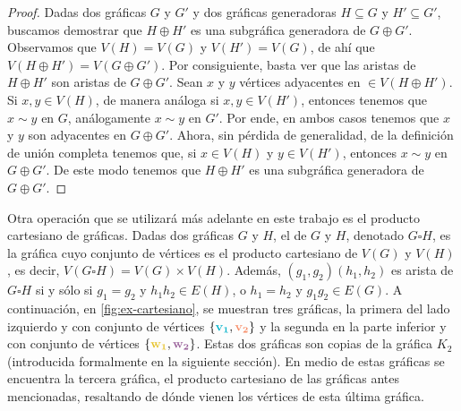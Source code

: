 \begin{proof}
    Dadas dos gr\'aficas $G$ y $G'$ y dos gr\'aficas generadoras $H \subseteq G$
    y $H'\subseteq G'$, buscamos demostrar que $H \oplus H'$ es una subgr\'afica
    generadora de $G \oplus G'$. Observamos que $V(H)=V(G)$ y $V(H')=V(G)$, de
    ah\'i que $V(H \oplus H')=V(G \oplus G')$. Por consiguiente, basta ver que
    las aristas de $H \oplus H'$ son aristas de $G \oplus G'$. Sean $x$ y $y$
    v\'ertices adyacentes en $\in V(H \oplus H')$. Si $x,y \in V(H)$, de manera
    an\'aloga si $x,y \in V(H')$, entonces tenemos que $x \sim y$ en $G$,
    an\'alogamente $x \sim y$ en $G'$. Por ende, en ambos casos tenemos que $x$
    y $y$ son adyacentes en $G \oplus G'$. Ahora, sin p\'erdida de generalidad,
    de la definici\'on de  uni\'on completa tenemos que, si $x \in V(H)$ y $y
    \in V(H')$, entonces $x \sim y$ en $G \oplus G'$. De este modo tenemos que
    $H \oplus H'$ es una subgr\'afica generadora de $G \oplus G'$.
\end{proof}

Otra operaci\'on que se utilizar\'a m\'as adelante en este trabajo es el
producto cartesiano de gr\'aficas. Dadas dos gr\'aficas $G$ y $H$, el
 de $G$ y $H$, denotado $G \square H$, es la
gr\'afica cuyo conjunto de v\'ertices es el producto cartesiano de $V(G)$ y
$V(H)$, es decir, $V(G \square H) = V(G) \times V(H)$. Adem\'as,
$(g_1,g_2)(h_1,h_2)$ es arista de $G \square H$ si y s\'olo si $g_1 = g_2$ y
$h_1h_2 \in E(H)$, o $h_1 = h_2$ y $g_1g_2 \in E(G)$. A continuaci\'on, en
\cref{fig:ex-cartesiano}, se muestran tres gr\'aficas, la primera del lado
izquierdo y con conjunto de v\'ertices $\{{\color{azulCielo}\bf{v_1}},
{\color{coral}\bf{v_2}}\}$ y la segunda en la parte inferior y con conjunto de
v\'ertices $\{{\color{amarillo}\bf{w_1}},{\color{morado}\bf{w_2}}\}$. Estas dos
gr\'aficas son copias de la gr\'afica $K_2$ (introducida formalmente en la
siguiente secci\'on). En medio de estas gr\'aficas se encuentra la tercera
gr\'afica, el producto cartesiano de las gr\'aficas antes mencionadas,
resaltando de d\'onde vienen los v\'ertices de esta \'ultima gr\'afica.

